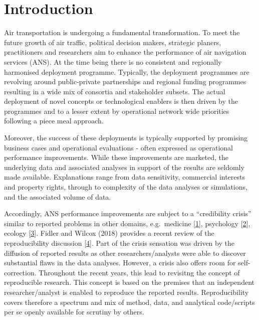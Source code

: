 \documentclass[conference,final,a4paper,]{IEEEtran}
\begin{document}
%
\IEEEpeerreviewmaketitle


\section{Introduction}\label{introduction}

Air transportation is undergoing a fundamental transformation. To meet
the future growth of air traffic, political decision makers, strategic
planers, practitioners and researchers aim to enhance the performance of
air navigation services (ANS). At the time being there is no consistent
and regionally harmonised deployment programme. Typically, the
deployment programmes are revolving around public-private partnerships
and regional funding programmes resulting in a wide mix of consortia and
stakeholder subsets. The actual deployment of novel concepts or
technological enablers is then driven by the programmes and to a lesser
extent by operational network wide priorities following a piece meal
approach.

Moreover, the success of these deployments is typically supported by
promising business cases and operational evaluations - often expressed
as operational performance improvements. While these improvements are
marketed, the underlying data and associated analyses in support of the
results are seldomly made available. Explanations range from data
sensitivity, commercial interests and property rights, through to
complexity of the data analyses or simulations, and the associated
volume of data.

Accordingly, ANS performance improvements are subject to a ``credibility
crisis'' similar to reported problems in other domains, e.g.~medicine
{[}\protect\hyperlink{ref-kolata_2011}{1}{]}, psychology
{[}\protect\hyperlink{ref-ritchie_2012}{2}{]}, ecology
{[}\protect\hyperlink{ref-fraser_etal_2018}{3}{]}. Fidler and Wilcox
(2018) provides a recent review of the reproducibility discussion
{[}\protect\hyperlink{ref-fidler_wilcox_2018}{4}{]}. Part of the crisis
sensation was driven by the diffusion of reported results as other
researchers/analysts were able to discover substantial flaws in the data
analyses. However, a crisis also offers room for self-correction.
Throughout the recent years, this lead to revisitng the concept of
reproducible research. This concept is based on the premises that an
independent researcher/analyst is enabled to reproduce the reported
results. Reproducibility covers therefore a spectrum and mix of method,
data, and analytical code/scripts per se openly available for scrutiny
by others.
\end{document}
